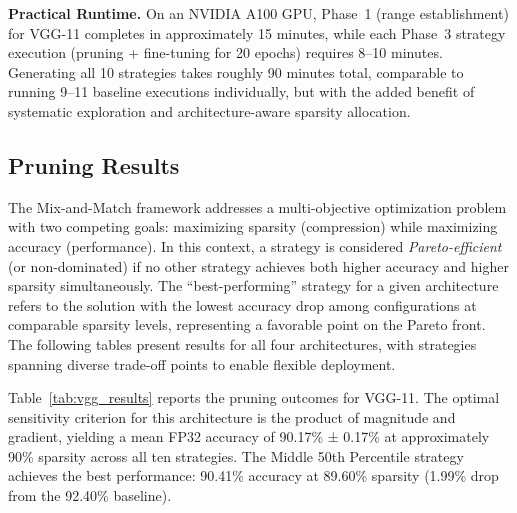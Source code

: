 \documentclass[11pt, conference]{IEEEtran}
\begin{document}
\textbf{Practical Runtime.}
On an NVIDIA A100 GPU, Phase~1 (range establishment) for VGG-11 completes in approximately 15 minutes, while each Phase~3 strategy execution (pruning + fine-tuning for 20 epochs) requires 8--10 minutes. Generating all 10 strategies takes roughly 90 minutes total, comparable to running 9--11 baseline executions individually, but with the added benefit of systematic exploration and architecture-aware sparsity allocation.

\FloatBarrier
\subsection{Pruning Results}

The Mix-and-Match framework addresses a multi-objective optimization problem with two competing goals: maximizing sparsity (compression) while maximizing accuracy (performance). In this context, a strategy is considered \textit{Pareto-efficient} (or non-dominated) if no other strategy achieves both higher accuracy and higher sparsity simultaneously. The ``best-performing'' strategy for a given architecture refers to the solution with the lowest accuracy drop among configurations at comparable sparsity levels, representing a favorable point on the Pareto front. The following tables present results for all four architectures, with strategies spanning diverse trade-off points to enable flexible deployment.

Table~\ref{tab:vgg_results} reports the pruning outcomes for VGG-11. The optimal sensitivity criterion for this architecture is the product of magnitude and gradient, yielding a mean FP32 accuracy of 90.17\% ± 0.17\% at approximately 90\% sparsity across all ten strategies. The Middle 50th Percentile strategy achieves the best performance: 90.41\% accuracy at 89.60\% sparsity (1.99\% drop from the 92.40\% baseline). 
\end{document}
